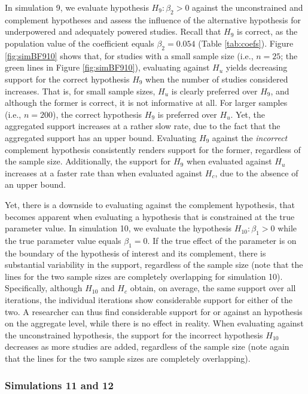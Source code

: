 \documentclass[review, 3p, authoryear]{elsarticle} %
\begin{document}
In simulation 9, we evaluate hypothesis \(H_9: \beta_2 > 0\) against the unconstrained and complement hypotheses and assess the influence of the alternative hypothesis for underpowered and adequately powered studies.
Recall that \(H_9\) is correct, as the population value of the coefficient equals \(\beta_2 = 0.054\) (Table \ref{tab:coefs}).
Figure \ref{fig:simBF910} shows that, for studies with a small sample size (i.e., \(n = 25\); the green lines in Figure \ref{fig:simBF910}), evaluating against \(H_u\) yields decreasing support for the correct hypothesis \(H_9\) when the number of studies considered increases.
That is, for small sample sizes, \(H_u\) is clearly preferred over \(H_9\), and although the former is correct, it is not informative at all.
For larger samples (i.e., \(n = 200\)), the correct hypothesis \(H_9\) is preferred over \(H_u\).
Yet, the aggregated support increases at a rather slow rate, due to the fact that the aggregated support has an upper bound.
Evaluating \(H_9\) against the \emph{incorrect} complement hypothesis consistently renders support for the former, regardless of the sample size.
Additionally, the support for \(H_9\) when evaluated against \(H_u\) increases at a faster rate than when evaluated against \(H_c\), due to the absence of an upper bound.

Yet, there is a downside to evaluating against the complement hypothesis, that becomes apparent when evaluating a hypothesis that is constrained at the true parameter value.
In simulation 10, we evaluate the hypothesis \(H_{10}: \beta_1 > 0\) while the true parameter value equals \(\beta_1 = 0\).
If the true effect of the parameter is on the boundary of the hypothesis of interest and its complement, there is substantial variability in the support, regardless of the sample size (note that the lines for the two sample sizes are completely overlapping for simulation 10).
Specifically, although \(H_{10}\) and \(H_c\) obtain, on average, the same support over all iterations, the individual iterations show considerable support for either of the two.
A researcher can thus find considerable support for or against an hypothesis on the aggregate level, while there is no effect in reality.
When evaluating against the unconstrained hypothesis, the support for the incorrect hypothesis \(H_{10}\) decreases as more studies are added, regardless of the sample size (note again that the lines for the two sample sizes are completely overlapping).

\hypertarget{simulations-11-and-12}{%
\subsubsection{Simulations 11 and 12}\label{simulations-11-and-12}}
\end{document}
